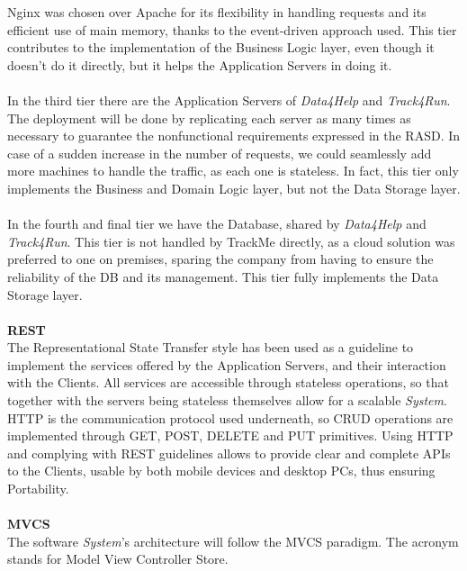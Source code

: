 \documentclass[titlepage]{article}
\begin{document}
Nginx was chosen over Apache for its flexibility in handling requests and its efficient use of main memory, thanks to the event-driven approach used.
This tier contributes to the implementation of the Business Logic layer, even though it doesn’t do it directly, but it helps the Application Servers in doing it.\\ \\
In the third tier there are the Application Servers of {\it Data4Help} and {\it Track4Run}. The deployment will be done by replicating each server as many times as necessary to guarantee the nonfunctional requirements expressed in the RASD. In case of a sudden increase in the number of requests, we could seamlessly add more machines to handle the traffic, as each one is stateless. In fact, this tier only implements the Business and Domain Logic layer, but not the Data Storage layer. \\ \\
In the fourth and final tier we have the Database, shared by {\it Data4Help} and {\it Track4Run}. This tier is not handled by TrackMe directly, as a cloud solution was preferred to one on premises, sparing the company from having to ensure the reliability of the DB and its management. 
This tier fully implements the Data Storage layer.\\ \\
{\bf REST}\\
The Representational State Transfer style has been used as a guideline to implement the services offered by the Application Servers, and their interaction with the Clients. All services are accessible through stateless operations, so that together with the servers being stateless themselves allow for a scalable {\it System}.
HTTP is the communication protocol used underneath, so CRUD operations are implemented through GET, POST, DELETE and PUT primitives. 
Using HTTP and complying with REST guidelines allows to provide clear and complete APIs to the Clients, usable by both mobile devices and desktop PCs, thus ensuring Portability.\\ \\
{\bf MVCS}\\
The software {\it System}’s architecture will follow the MVCS paradigm. The acronym stands for Model View Controller Store.
\end{document}
